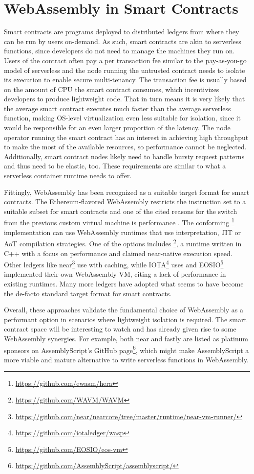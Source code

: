 \section{WebAssembly in Smart Contracts}

Smart contracts are programs deployed to distributed ledgers from where they can be run by users on-demand. As such, smart contracts are akin to serverless functions, since developers do not need to manage the machines they run on. Users of the contract often pay a per transaction fee similar to the pay-as-you-go model of serverless and the node running the untrusted contract needs to isolate its execution to enable secure multi-tenancy.
The transaction fee is usually based on the amount of CPU the smart contract consumes, which incentivizes developers to produce lightweight code. That in turn means it is very likely that the average smart contract executes much faster than the average serverless function, making OS-level virtualization even less suitable for isolation, since it would be responsible for an even larger proportion of the latency. The node operator running the smart contract has an interest in achieving high throughput to make the most of the available resources, so performance cannot be neglected. Additionally, smart contract nodes likely need to handle bursty request patterns and thus need to be elastic, too.
These requirements are similar to what a serverless container runtime needs to offer.

Fittingly, WebAssembly has been recognized as a suitable target format for smart contracts. The Ethereum-flavored WebAssembly restricts the instruction set to a suitable subset for smart contracts and one of the cited reasons for the switch from the previous custom virtual machine is performance \cite{Ewasm2021}.
The conforming \footnote{\url{https://github.com/ewasm/hera}} implementation can use WebAssembly runtimes that use interpretation, JIT or AoT compilation strategies. One of the options includes \footnote{\url{https://github.com/WAVM/WAVM}}, a runtime written in C++ with a focus on performance and claimed near-native execution speed.
Other ledgers like near\footnote{\url{https://github.com/near/nearcore/tree/master/runtime/near-vm-runner/}} use  with caching, while IOTA\footnote{\url{https://github.com/iotaledger/wasp}} uses  and EOSIO\footnote{\url{https://github.com/EOSIO/eos-vm}} implemented their own WebAssembly VM, citing a lack of performance in existing runtimes. Many more ledgers have adopted what seems to have become the de-facto standard target format for smart contracts.

Overall, these approaches validate the fundamental choice of WebAssembly as a performant option in scenarios where lightweight isolation is required. The smart contract space will be interesting to watch and has already given rise to some WebAssembly synergies. For example, both near and fastly are listed as platinum sponsors on AssemblyScript's GitHub page\footnote{\url{https://github.com/AssemblyScript/assemblyscript/}}, which might make AssemblyScript a more viable and mature alternative to write serverless functions in WebAssembly.
